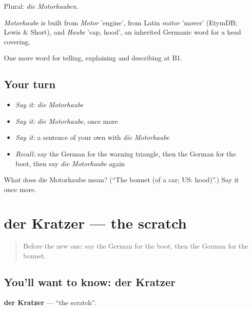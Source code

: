Plural: \emph{die Motorhauben}.

\begin{cousinweb}
\emph{Motorhaube} is built from \emph{Motor} 'engine', from Latin \emph{mōtor} 'mover' (EtymDB; Lewis \& Short), and \emph{Haube} 'cap, hood', an inherited Germanic word for a head covering.
\end{cousinweb}

\begin{grammarlens}[title={What you've built}]
One more word for telling, explaining and describing at B1.
\end{grammarlens}

\subsection*{Your turn}
\begin{itemize}
\raggedright
  \item \emph{Say it:} \emph{die Motorhaube}
  \item \emph{Say it:} \emph{die Motorhaube}, once more
  \item \emph{Say it:} a sentence of your own with \emph{die Motorhaube}
  \item \emph{Recall:} say the German for the warning triangle, then the German for the boot, then say \emph{die Motorhaube} again
\end{itemize}

\begin{tcolorbox}[breakable,colback=teal!4,colframe=teal!35!black,title={Before you move on}]
What does die Motorhaube mean? (\textquotedblleft{}The bonnet (of a car; US: hood)\textquotedblright{}.) Say it once more.
\end{tcolorbox}
\section[der Kratzer]{der Kratzer — the scratch}

\label{lesson:GE-C405-kratzer}



\begin{quote}
Before the new one: say the German for the boot, then the German for the bonnet.
\end{quote}

\subsection*{You'll want to know: der Kratzer}
\textbf{der Kratzer} — \textquotedblleft{}the scratch\textquotedblright{}.

